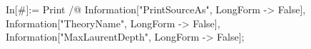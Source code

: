 In[#]:= Print /@ {Information["PrintSourceAs", LongForm -> False], Information["TheoryName", LongForm -> False], Information["MaxLaurentDepth", LongForm -> False]}; 